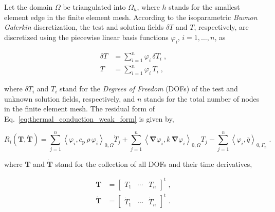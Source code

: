 \documentclass[10pt,a4paper]{article}
\begin{document}
Let the domain $\Omega$ be triangulated into $\Omega_h$, where $h$ stands for the smallest element edge in the finite element mesh. According to the isoparametric \textit{Buvnon Galerkin} discretization, the test and solution fields $\delta T$ and $T$, respectively, are discretized using the piecewise linear basis functions $\varphi_i$, $i = 1, \ldots, n$, as

\begin{subequations}
	\begin{alignat}{1}
		\delta T &= \sum_{i = 1}^n \varphi_i \, \delta T_i \;, \label{eq:test_field_discretization} \\
		T &= \sum_{i = 1}^n  \varphi_i \, T_i \;, \label{eq:solution_field_discretization}
	\end{alignat}
\end{subequations}

where $\delta T_i$ and $T_i$ stand for the \textit{Degrees of Freedom} (DOFs) of the test and unknown solution fields, respectively, and $n$ stands for the total number of nodes in the finite element mesh. The residual form of Eq.~\eqref{eq:thermal_conduction_weak_form} is given by,

\begin{equation}
	R_i(\mathbf{T}, \dot{\mathbf{T}}) = \sum_{j = 1}^n \left< \varphi_i , c_{\text{p}} \, \rho \,\varphi_i \right>_{0,\Omega} \dot{T}_j + \sum_{j = 1}^n \left< \boldsymbol{\nabla} \varphi_i , k \, \boldsymbol{\nabla} \varphi_i \right>_{0,\Omega} T_j - \sum_{j = 1}^n\left< \varphi_i , \bar{q} \right>_{0, \Gamma_{\text{n}}}\;. \label{eq:thermal_conduction_residual_form} 
\end{equation}

where $\mathbf{T}$ and $\dot{\mathbf{T}}$ stand for the collection of all DOFs and their time derivatives,

\begin{subequations}
	\begin{alignat}{1}
		\mathbf{T} &= \left[ \begin{array}{ccc} T_1 & \cdots & T_n \end{array} \right]^{\text{t}} \;, \label{eq:vector_of_dofs} \\
		\dot{\mathbf{T}} &= \left[ \begin{array}{ccc} \dot{T}_1 & \cdots & \dot{T}_n \end{array} \right]^{\text{t}} \;. \label{eq:vector_of_timeDerivatives_dofs}
	\end{alignat}
	\label{eq:vectors_of_dofs}
\end{subequations}
\end{document}
